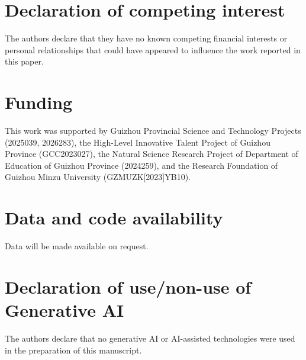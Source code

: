 \documentclass[a4paper,preprint,12pt]{elsarticle}
\theoremstyle{remark}
\begin{document}
\section*{Declaration of competing interest}
The authors declare that they have no known competing financial interests or personal relationships that could have appeared to influence the work reported in this paper.

\section*{Funding}
This work was supported by Guizhou Provincial Science and Technology Projects (2025039, 2026283), the High-Level Innovative Talent Project of Guizhou Province (GCC2023027), the Natural Science Research Project of Department of Education of Guizhou Province (2024259), and the Research Foundation of Guizhou Minzu University (GZMUZK[2023]YB10).


\section*{Data and code availability}
Data will be made available on request.

\section*{Declaration of use/non-use of Generative AI}
The authors declare that no generative AI or AI-assisted technologies were used in the preparation of this manuscript.
\end{document}
